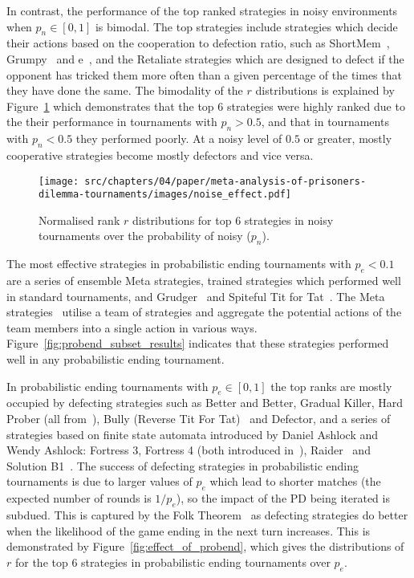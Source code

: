 In contrast, the performance of the top ranked strategies in noisy environments
when \(p_n\in [0, 1]\) is bimodal. The top strategies include strategies which
decide their actions based on the cooperation to defection ratio, such as
ShortMem~\cite{Andre2013}, Grumpy~\cite{axelrodproject} and
e~\cite{axelrodproject}, and the Retaliate strategies which are designed to
defect if the opponent has tricked them more often than a given percentage of the times that
they have done the same. The bimodality of the \(r\) distributions is explained
by Figure~\ref{fig:effect_of_noise} which demonstrates that the top 6 strategies
were highly ranked due to the their performance in tournaments with \(p_n>0.5\),
and that in tournaments with \(p_n<0.5\) they
performed poorly. At a noisy level of \(0.5\) or greater, mostly cooperative strategies
become mostly defectors and vice versa.

\begin{figure}[!htbp]
    \centering
    \texttt{[image: src/chapters/04/paper/meta-analysis-of-prisoners-dilemma-tournaments/images/noise\_effect.pdf]}
    \caption{Normalised rank \(r\) distributions for top 6 strategies in noisy tournaments over
    the probability of noisy ($p_n$).}
    \label{fig:effect_of_noise}
\end{figure}

The most effective strategies in probabilistic ending
tournaments with \(p_e< 0.1\) are a series of ensemble Meta strategies, trained strategies
which performed well
in standard tournaments, and Grudger~\cite{axelrodproject} and Spiteful Tit for
Tat~\cite{prison}. The Meta strategies~\cite{axelrodproject} utilise a team of
strategies and aggregate the potential actions of the team members into a single action
in various ways. Figure~\ref{fig:probend_subset_results} indicates that these strategies
performed well in any probabilistic ending tournament.

In probabilistic ending tournaments with \(p_e \in [0, 1]\) the top ranks are
mostly occupied by defecting strategies such as Better and Better, Gradual
Killer, Hard Prober (all from~\cite{axelrodproject}), Bully (Reverse Tit For
Tat)~\cite{Nachbar1992} and Defector, and a series of strategies based on finite
state automata introduced by Daniel Ashlock and Wendy Ashlock: Fortress 3,
Fortress 4 (both introduced in~\cite{Ashlock2006}), Raider~\cite{Ashlock2014}
and Solution B1~\cite{Ashlock2014}. The success of defecting strategies in
probabilistic ending tournaments is due to larger values of
\(p_e\) which lead to shorter matches (the expected number of rounds is \(1 / p_e\)), so the
impact of the PD being iterated is subdued. This is captured by the Folk
Theorem~\cite{Fudenberg2009} as defecting strategies do better when the likelihood
of the game ending in the next turn increases.
This is demonstrated by Figure~\ref{fig:effect_of_probend}, which gives the
distributions of \(r\) for the top 6 strategies in probabilistic ending tournaments
over \(p_e\).


